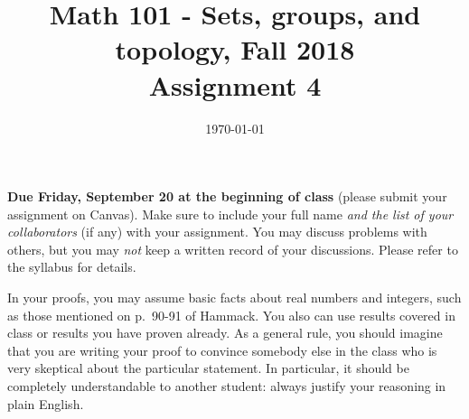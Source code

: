 \documentclass{amsart}
\title[Math 101, Fall 2018: assignment 4]{Math 101 - Sets, groups, and topology, Fall 2018 \\ Assignment 4}
\date{\today}
\theoremstyle{definition}
\begin{document}

\maketitle

\textbf{Due Friday, September 20 at the beginning of class} (please submit your assignment on Canvas). Make sure to include your full name \emph{and the list of your collaborators} (if any) with your assignment. You may discuss problems with others, but you may \emph{not} keep a written record of your discussions. Please refer to the syllabus for details.

In your proofs, you may assume basic facts about real numbers and integers, such as those mentioned on p.~90-91 of Hammack. You also can use results covered in class or results you have proven already. As a general rule, you should imagine that you are writing your proof to convince somebody else in the class who is very skeptical about the particular statement. In particular, it should be completely understandable to another student: always justify your reasoning in plain English. 
\end{document}
